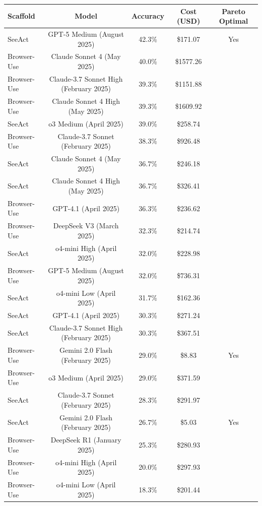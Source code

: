 \begin{tabular}{lcccc}
\toprule
Scaffold & Model & Accuracy & Cost (USD) & Pareto Optimal \\
\midrule
SeeAct & GPT-5 Medium (August 2025) & 42.3\% & \$171.07 & Yes \\
Browser-Use & Claude Sonnet 4 (May 2025) & 40.0\% & \$1577.26 &  \\
Browser-Use & Claude-3.7 Sonnet High (February 2025) & 39.3\% & \$1151.88 &  \\
Browser-Use & Claude Sonnet 4 High (May 2025) & 39.3\% & \$1609.92 &  \\
SeeAct & o3 Medium (April 2025) & 39.0\% & \$258.74 &  \\
Browser-Use & Claude-3.7 Sonnet (February 2025) & 38.3\% & \$926.48 &  \\
SeeAct & Claude Sonnet 4 (May 2025) & 36.7\% & \$246.18 &  \\
SeeAct & Claude Sonnet 4 High (May 2025) & 36.7\% & \$326.41 &  \\
Browser-Use & GPT-4.1 (April 2025) & 36.3\% & \$236.62 &  \\
Browser-Use & DeepSeek V3 (March 2025) & 32.3\% & \$214.74 &  \\
SeeAct & o4-mini High (April 2025) & 32.0\% & \$228.98 &  \\
Browser-Use & GPT-5 Medium (August 2025) & 32.0\% & \$736.31 &  \\
SeeAct & o4-mini Low (April 2025) & 31.7\% & \$162.36 &  \\
SeeAct & GPT-4.1 (April 2025) & 30.3\% & \$271.24 &  \\
SeeAct & Claude-3.7 Sonnet High (February 2025) & 30.3\% & \$367.51 &  \\
Browser-Use & Gemini 2.0 Flash (February 2025) & 29.0\% & \$8.83 & Yes \\
Browser-Use & o3 Medium (April 2025) & 29.0\% & \$371.59 &  \\
SeeAct & Claude-3.7 Sonnet (February 2025) & 28.3\% & \$291.97 &  \\
SeeAct & Gemini 2.0 Flash (February 2025) & 26.7\% & \$5.03 & Yes \\
Browser-Use & DeepSeek R1 (January 2025) & 25.3\% & \$280.93 &  \\
Browser-Use & o4-mini High (April 2025) & 20.0\% & \$297.93 &  \\
Browser-Use & o4-mini Low (April 2025) & 18.3\% & \$201.44 &  \\
\bottomrule
\end{tabular}